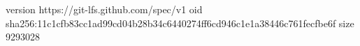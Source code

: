 version https://git-lfs.github.com/spec/v1
oid sha256:11c1cfb83cc1ad99cd04b28b34c6440274ff6cd946c1e1a38446c761fecfbe6f
size 9293028
